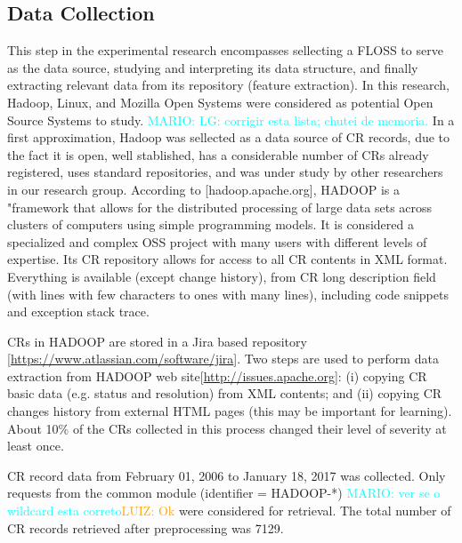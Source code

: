 \documentclass[10pt, conference]{IEEEtran}
\newcommand{\luiz}[1]{\noindent\textcolor{orange}{LUIZ: {#1}}}
\newcommand{\mario}[1]{\noindent\textcolor{cyan}{MARIO: {#1}}}
\newcommand{\luiz}[1]{}
\newcommand{\mario}[1]{}
\begin{document}
\subsection{Data Collection} 	\label{subsec:collection}
This step in the experimental research encompasses sellecting a FLOSS to serve as the data source, studying and interpreting its data structure, and finally extracting relevant data from its repository (feature extraction). In this research, Hadoop, Linux, and Mozilla Open Systems were considered as potential Open Source Systems to study. \mario{LG: corrigir esta lista; chutei de memoria.} In a first approximation, Hadoop was sellected as a data source of CR records, due to the fact it is open, well stablished, has a considerable number of CRs already registered, uses standard repositories, and was under study by other researchers in our research group. According to [hadoop.apache.org], HADOOP is a "framework that allows for the distributed processing of large data sets across clusters of computers using simple programming models. It is considered a specialized and complex OSS project with many users with different levels of expertise. Its CR repository allows for access to all CR contents in XML format. Everything is available (except change history), from CR long description field (with lines with few characters to ones with many lines), including code snippets and exception stack trace.

CRs in HADOOP are stored in a Jira based repository [\url{https://www.atlassian.com/software/jira}]. Two steps are used to perform data extraction from HADOOP web site[\url{http://issues.apache.org}]: (i) copying CR basic data (e.g. status and resolution) from XML contents; and (ii) copying CR changes history from external HTML pages (this may be important for learning). About 10\% of the CRs collected in this process changed their level of severity at least once.

CR record data from February 01, 2006 to January 18, 2017 was collected.  Only requests from the common module (identifier = HADOOP-*) \mario{ver se o wildcard esta correto}\luiz{Ok} were considered for retrieval. The total number of CR records retrieved after preprocessing was 7129. 


\end{document}
